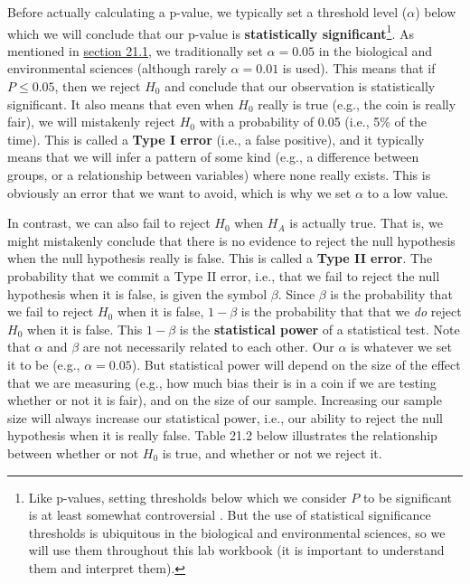 \documentclass[
  openany]{scrbook}
\begin{document}
Before actually calculating a p-value, we typically set a threshold level (\(\alpha\)) below which we will conclude that our p-value is \textbf{statistically significant}\footnote{Like p-values, setting thresholds below which we consider \(P\) to be significant is at least somewhat controversial \citep{McShane2019, Mayo2021}. But the use of statistical significance thresholds is ubiquitous in the biological and environmental sciences, so we will use them throughout this lab workbook (it is important to understand them and interpret them).}.
As mentioned in \protect\hyperlink{how-ridiculous-is-our-hypothesis}{section 21.1}, we traditionally set \(\alpha= 0.05\) in the biological and environmental sciences (although rarely \(\alpha = 0.01\) is used).
This means that if \(P \leq 0.05\), then we reject \(H_{0}\) and conclude that our observation is statistically significant.
It also means that even when \(H_{0}\) really is true (e.g., the coin is really fair), we will mistakenly reject \(H_{0}\) with a probability of 0.05 (i.e., 5\% of the time).
This is called a \textbf{Type I error} (i.e., a false positive), and it typically means that we will infer a pattern of some kind (e.g., a difference between groups, or a relationship between variables) where none really exists.
This is obviously an error that we want to avoid, which is why we set \(\alpha\) to a low value.

In contrast, we can also fail to reject \(H_{0}\) when \(H_{A}\) is actually true.
That is, we might mistakenly conclude that there is no evidence to reject the null hypothesis when the null hypothesis really is false.
This is called a \textbf{Type II error}.
The probability that we commit a Type II error, i.e., that we fail to reject the null hypothesis when it is false, is given the symbol \(\beta\).
Since \(\beta\) is the probability that we fail to reject \(H_{0}\) when it is false, \(1 - \beta\) is the probability that that we \emph{do} reject \(H_{0}\) when it is false.
This \(1 - \beta\) is the \textbf{statistical power} of a statistical test.
Note that \(\alpha\) and \(\beta\) are not necessarily related to each other.
Our \(\alpha\) is whatever we set it to be (e.g., \(\alpha = 0.05\)).
But statistical power will depend on the size of the effect that we are measuring (e.g., how much bias their is in a coin if we are testing whether or not it is fair), and on the size of our sample.
Increasing our sample size will always increase our statistical power, i.e., our ability to reject the null hypothesis when it is really false.
Table 21.2 below illustrates the relationship between whether or not \(H_{0}\) is true, and whether or not we reject it.
\end{document}

